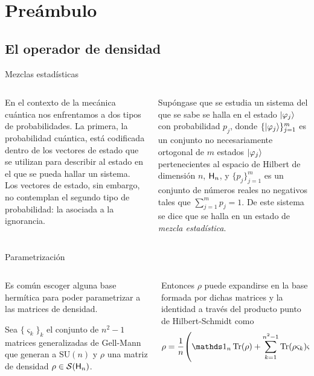 \section{Preámbulo}

\subsection{El operador de densidad}

\begin{frame}{Mezclas estadísticas}
    \begin{columns}
        \begin{column}{0.5\textwidth}
            En el contexto de la mecánica cuántica nos enfrentamos a dos tipos de probabilidades. La primera, la probabilidad cuántica, está codificada dentro de los vectores de estado que se utilizan para describir al estado en el que se pueda hallar un sistema. Los vectores de estado, sin embargo, no contemplan el segundo tipo de probabilidad: la asociada a la ignorancia.
        \end{column}
        \pause
        \begin{column}{0.5\textwidth}
            Supóngase que se estudia un sistema del que se sabe se halla en el estado $\ket{\varphi_{j}}$ con probabilidad $p_{j}$, donde $\{\ket{\varphi_{j}}\}_{j=1}^{m}$ es un conjunto no necesariamente ortogonal de $m$ estados $\ket{\varphi_{j}}$ pertenecientes al espacio de Hilbert de dimensión $n$, ${\sf H}_{n}$, y $\{p_{j}\}_{j=1}^{m}$ es un conjunto de números reales no negativos tales que $\sum_{j=1}^{m} p_{j}=1$. De este sistema se dice que se halla en un estado de \textit{mezcla estadística}.
        \end{column}
    \end{columns}
\end{frame}

\begin{frame}{Parametrización}
    \begin{columns}
        \begin{column}{0.5\textwidth}
            Es común escoger alguna base hermítica para poder parametrizar a las matrices de densidad.

            Sea $\{\varsigma_{k}\}_{k}$ el conjunto de $n^{2}-1$ matrices generalizadas de Gell-Mann que generan a $\text{SU}(n)$ y $\rho$ una matriz de densidad $\rho\in\mathcal{S}({\sf H}_{n})$.
        \end{column}
        \pause
        \begin{column}{0.5\textwidth}
            Entonces $\rho$ puede expandirse en la base formada por dichas matrices y la identidad a través del producto punto de Hilbert-Schmidt como
            \begin{equation}
                \rho=\frac{1}{n}\qty(\Id_{n}\Tr(\rho)+\sum_{k=1}^{n^{2}-1}\Tr(\rho\varsigma_{k})\varsigma_{k}).\nonumber
            \end{equation}
        \end{column}
    \end{columns}
\end{frame}


